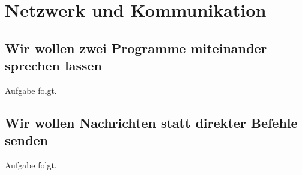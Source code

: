\part{Netzwerk und Kommunikation}

\chapter{Wir wollen zwei Programme miteinander sprechen lassen}


\kapitelstruktur

\begin{aufgabeBox}
Aufgabe folgt.
\end{aufgabeBox}


\chapter{Wir wollen Nachrichten statt direkter Befehle senden}


\kapitelstruktur

\begin{aufgabeBox}
Aufgabe folgt.
\end{aufgabeBox}


